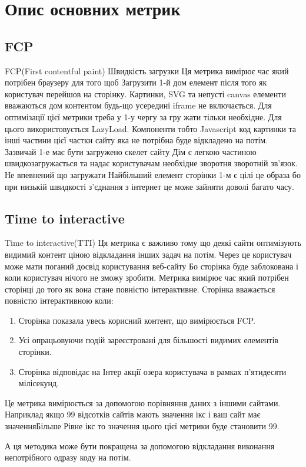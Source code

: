 \section{Опис основних метрик}
\subsection{FCP}
FCP(First contentful paint) Швидкість загрузки Ця метрика вимірює час який потрібен браузеру для того щоб Загрузити 1-й дом
елемент після того як користувач перейшов на сторінку.
Картинки, SVG та непусті canvas елементи вважаються дом контентом будь-що усередині iframe не включається.
Для оптимізації цієї метрики треба у 1-у чергу за гру жати тільки необхідне. Для цього використовується LazyLoad.
Компоненти тобто Javascript код картинки та інші частини цієї частки сайту яка не потрібна буде відкладено на потім.
Зазвичай 1-е має бути загружено скелет сайту Дім є легкою частиною швидкозагружається та надає користувачам необхідне зворотня зворотній зв'язок.
Не впевнений що загружати Найбільший елемент сторінки 1-м є цілі це образа
бо при низькій швидкості з'єднання з інтернет це може зайняти доволі багато часу.
\subsection{Time to interactive}
Time to interactive(TTI)
Ця метрика є важливо тому що деякі сайти оптимізують видимий контент ціною відкладання інших задач на потім.
Через це користувач може мати поганий досвід користування веб-сайту Бо сторінка буде заблокована і коли користувач нічого не зможу зробити.
Метрика вимірює час який потрібен сторінці до того як вона стане повністю інтерактивне. Сторінка вважається повністю інтерактивною коли:
\begin{enumerate}
    \item Сторінка показала увесь корисний контент, що вимірюється FCP.
    \item Усі опрацьовуючи подій зареєстровані для більшості видимих елементів сторінки.
    \item Сторінка відповідає на Інтер акції озера користувача в рамках п'ятидесяти мілісекунд.
\end{enumerate}

Це метрика вимірюється за допомогою порівняння даних з іншими сайтами. Наприклад якщо 99 відсотків сайтів мають значення ікс і ваш сайт має значенняБільше Рівне ікс то значення цього цієї метрики буде становити 99.

А ця методика може бути покращена за допомогою відкладання виконання непотрібного одразу коду на потім.

